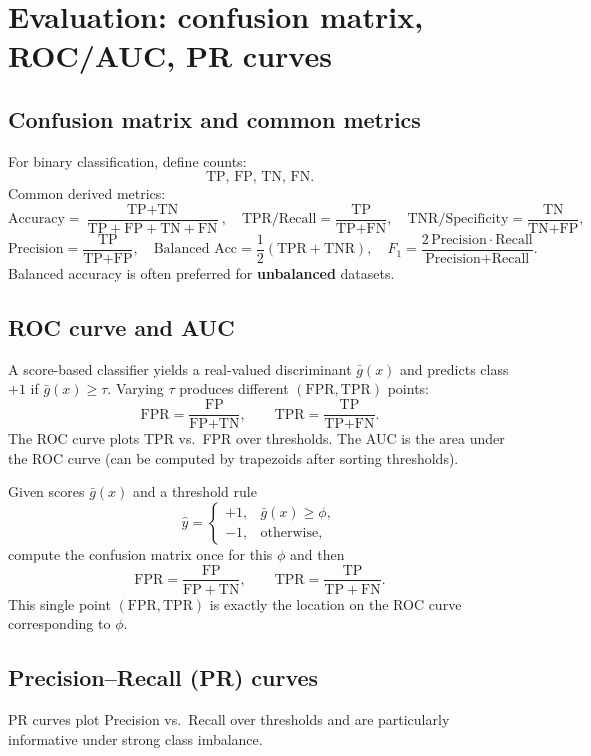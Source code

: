 \documentclass[11pt, oneside]{book}
\newcommand{\1}{\ind}                       %
\begin{document}
\section{Evaluation: confusion matrix, ROC/AUC, PR curves}
\subsection{Confusion matrix and common metrics}
For binary classification, define counts:
\[
\text{TP, FP, TN, FN.}
\]
Common derived metrics:
\[
\text{Accuracy}=\frac{\text{TP}+\text{TN}}{\text{TP}+\text{FP}+\text{TN}+\text{FN}},
\quad
\text{TPR/Recall}=\frac{\text{TP}}{\text{TP}+\text{FN}},
\quad
\text{TNR/Specificity}=\frac{\text{TN}}{\text{TN}+\text{FP}},
\]
\[
\text{Precision}=\frac{\text{TP}}{\text{TP}+\text{FP}},
\quad
\text{Balanced Acc}=\frac{1}{2}(\text{TPR}+\text{TNR}),
\quad
F_1=\frac{2\,\text{Precision}\cdot\text{Recall}}{\text{Precision}+\text{Recall}}.
\]
Balanced accuracy is often preferred for \textbf{unbalanced} datasets.

\subsection{ROC curve and AUC}
A score-based classifier yields a real-valued discriminant $\bar g(x)$ and predicts class $+1$ if $\bar g(x)\ge \tau$.
Varying $\tau$ produces different $(\text{FPR},\text{TPR})$ points:
\[
\text{FPR}=\frac{\text{FP}}{\text{FP}+\text{TN}},\qquad \text{TPR}=\frac{\text{TP}}{\text{TP}+\text{FN}}.
\]
The ROC curve plots TPR vs.\ FPR over thresholds.
The AUC is the area under the ROC curve (can be computed by trapezoids after sorting thresholds).

\begin{notebox}[title={ROC Point at Fixed Threshold $\phi$}]
Given scores $\bar g(x)$ and a threshold rule
\[
\hat y=
\begin{cases}
+1,& \bar g(x)\ge \phi,\\
-1,& \text{otherwise},
\end{cases}
\]
compute the confusion matrix once for this $\phi$ and then
\[
\mathrm{FPR}=\frac{\mathrm{FP}}{\mathrm{FP}+\mathrm{TN}},\qquad
\mathrm{TPR}=\frac{\mathrm{TP}}{\mathrm{TP}+\mathrm{FN}}.
\]
This single point $(\mathrm{FPR},\mathrm{TPR})$ is exactly the location on the ROC curve corresponding to $\phi$.
\end{notebox}

\subsection{Precision--Recall (PR) curves}
PR curves plot Precision vs.\ Recall over thresholds and are particularly informative under strong class imbalance.
\end{document}
